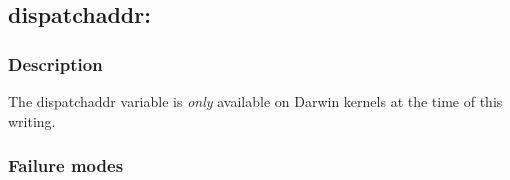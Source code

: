 \clearpage
{}
{}
\label{vars:dispatchaddr}
\subsection*{dispatchaddr:}

\subsubsection*{Description}

The dispatchaddr variable is \emph{only} available on Darwin kernels
at the time of this writing.

\subsubsection*{Failure modes}


